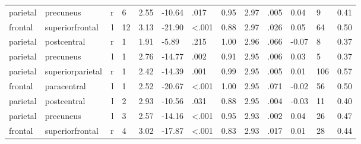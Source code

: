 \documentclass{article}
\begin{document}
\begin{longtable}{llrR{1.3cm}R{1cm}R{1.3cm}R{1cm}R{1cm}R{1.3cm}R{1cm}R{1.8cm}R{1.3cm}R{1.8cm}}
  parietal &                 precuneus &    r &         6 &                  2.55 &           -10.64 &               .017 &                               0.95 &                          2.97 &                            .005 &   0.04 &      9 &      0.41 \\
   frontal &           superiorfrontal &    l &        12 &                  3.13 &           -21.90 &      \textless.001 &                               0.88 &                          2.97 &                            .026 &   0.05 &     64 &      0.50 \\
  parietal &               postcentral &    r &         1 &                  1.91 &            -5.89 &               .215 &                               1.00 &                          2.96 &                            .066 &  -0.07 &      8 &      0.37 \\
  parietal &                 precuneus &    l &         1 &                  2.76 &           -14.77 &               .002 &                               0.91 &                          2.95 &                            .006 &   0.03 &      5 &      0.37 \\
  parietal &          superiorparietal &    r &         1 &                  2.42 &           -14.39 &               .001 &                               0.99 &                          2.95 &                            .005 &   0.01 &    106 &      0.57 \\
   frontal &               paracentral &    l &         1 &                  2.52 &           -20.67 &      \textless.001 &                               1.00 &                          2.95 &                            .071 &  -0.02 &     56 &      0.50 \\
  parietal &               postcentral &    l &         2 &                  2.93 &           -10.56 &               .031 &                               0.88 &                          2.95 &                            .004 &  -0.03 &     11 &      0.40 \\
  parietal &                 precuneus &    l &         3 &                  2.57 &           -14.16 &      \textless.001 &                               0.95 &                          2.93 &                            .002 &   0.04 &     26 &      0.47 \\
   frontal &           superiorfrontal &    r &         4 &                  3.02 &           -17.87 &      \textless.001 &                               0.83 &                          2.93 &                            .017 &   0.01 &     28 &      0.44 \\

\end{longtable}
\end{document}
